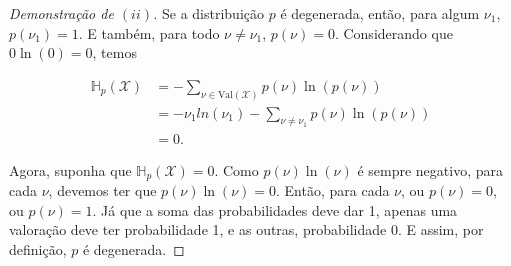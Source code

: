 \documentclass[paper=a4, fontsize=11pt]{scrartcl} %
\numberwithin{equation}{subsection}
\numberwithin{figure}{subsection}
\numberwithin{table}{subsection}
\numberwithin{definition}{subsection}
\numberwithin{theorem}{subsection}
\numberwithin{property}{subsection}
\numberwithin{proposition}{subsection}
\numberwithin{equation}{section}
\numberwithin{figure}{section}
\numberwithin{table}{section}
\numberwithin{definition}{section}
\numberwithin{theorem}{section}
\numberwithin{property}{section}
\numberwithin{proposition}{section}
\newcommand{\entp}{\ensuremath{\mathbb{H}_p}\xspace}
\newcommand{\varset}{\ensuremath{\mathcal{X}}\xspace}
\newcommand{\val}{\ensuremath{\text{Val}}\xspace}
\begin{document}
\begin{proof}[Demonstração de $(ii)$]

Se a distribuição $p$ é degenerada, então, para algum $\nu_1$, $p(\nu_1) = 1$. E também, para todo
$\nu \neq \nu_1$, $p(\nu) = 0$. Considerando que $0 \ln(0) = 0$, temos

\begin{align*}
\entp(\varset) 
  &= - \sum_{\nu \in \val(\varset)} p(\nu) \ln \left({p(\nu)} \right)  \\
  &= - \nu_1 ln (\nu_1) - \sum_{\nu \neq \nu_1} p(\nu) \ln \left({p(\nu)} \right) \\
  &= 0.
\end{align*}

Agora, suponha que $ \entp(\varset) = 0$. Como $p(\nu) \ln (\nu)$  é sempre negativo, para cada $\nu$, 
devemos ter que $p(\nu) \ln (\nu) = 0$. Então, para cada $\nu$, ou $p(\nu) = 0$, ou $p(\nu) = 1$. Já
que a soma das probabilidades deve dar 1, apenas uma valoração deve ter probabilidade 1, e as outras,
probabilidade 0. E assim, por definição, $p$ é degenerada.
\end{proof}
\end{document}
